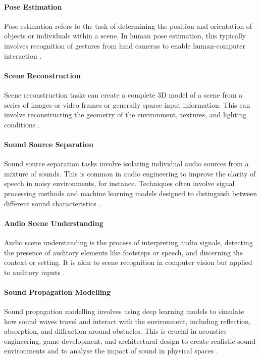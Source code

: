 \paragraph{Pose Estimation}
Pose estimation refers to the task of determining the position and orientation of objects or individuals within a scene. In human pose estimation, this typically involves recognition of gestures from \acrshort{hmd} cameras to enable human-computer interaction \citep{andriluka20142d, spittle2022review}.\par
\paragraph{Scene Reconstruction}
Scene reconstruction tasks can create a complete 3D model of a scene from a series of images or video frames or generally sparse input information. This can involve reconstructing the geometry of the environment, textures, and lighting conditions \citep{patow2003survey}.\par
\paragraph{Sound Source Separation}
Sound source separation tasks involve isolating individual audio sources from a mixture of sounds. This is common in audio engineering to improve the clarity of speech in noisy environments, for instance. Techniques often involve signal processing methods and machine learning models designed to distinguish between different sound characteristics \citep{virtanen2006sound}.\par
\paragraph{Audio Scene Understanding}
Audio scene understanding is the process of interpreting audio signals, detecting the presence of auditory elements like footsteps or speech, and discerning the context or setting. It is akin to scene recognition in computer vision but applied to auditory inputs \citep{abesser2020review}.\par
\paragraph{Sound Propagation Modelling}
Sound propagation modelling involves using deep learning models to simulate how sound waves travel and interact with the environment, including reflection, absorption, and diffraction around obstacles. This is crucial in acoustics engineering, game development, and architectural design to create realistic sound environments and to analyse the impact of sound in physical spaces \citep{liu2022sound}.\par
